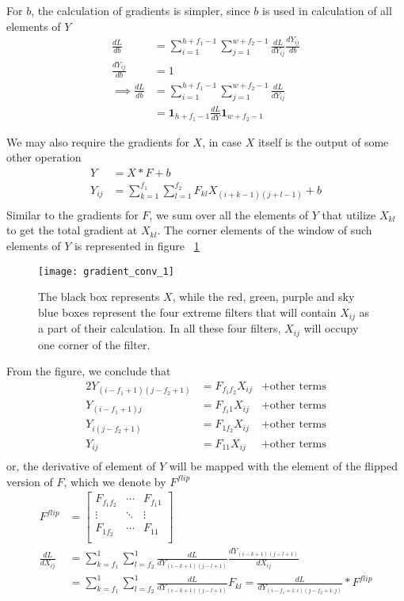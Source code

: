 \documentclass[../../deep_learning_notes.tex]{subfiles}
\begin{document}
For $b$, the calculation of gradients is simpler, since $b$ is used in calculation of all elements of $Y$
\begin{align*}
    \frac{dL}{db} &= \sum_{i=1}^{h+f_{1}-1} \sum_{j=1}^{w+f_{2}-1} \frac{dL}{dY_{ij}} \frac{dY_{ij}}{db}\\
    \frac{dY_{ij}}{db} &= 1\\
    \implies \frac{dL}{db} &= \sum_{i=1}^{h+f_{1}-1} \sum_{j=1}^{w+f_{2}-1} \frac{dL}{dY_{ij}}\\
    &= \bm{1}_{h+f_{1}-1}\frac{dL}{dY}\bm{1}_{w+f_{2}-1}
\end{align*}

We may also require the gradients for $X$, in case $X$ itself is the output of some other operation
\begin{align*}
    Y &= X * F + b\\
    Y_{ij} &= \sum_{k=1}^{f_{1}} \sum_{l=1}^{f_{2}} F_{kl} X_{(i+k-1)(j+l-1)} + b\\
\end{align*}
Similar to the gradients for $F$, we sum over all the elements of $Y$ that utilize $X_{kl}$ to get the total gradient at $X_{kl}$. The corner elements of the window of such elements of $Y$ is represented in figure ~\ref{fig:gradient_conv_1}
\begin{figure}[h]
    \texttt{[image: gradient\_conv\_1]}
    \centering
    \caption {The black box represents $X$, while the red, green, purple and sky blue boxes represent the four extreme filters that will contain $X_{ij}$ as a part of their calculation. In all these four filters, $X_{ij}$ will occupy one corner of the filter.}
    \label{fig:gradient_conv_1} %
\end{figure}
From the figure, we conclude that
\begin{alignat*}{2}
    Y_{(i-f_{1}+1)(j-f_{2}+1)} &= F_{f_{1}f_{2}}X_{ij} &+ \text{other terms}\\
    Y_{(i-f_{1}+1)j} &= F_{f_{1}1}X_{ij} &+ \text{other terms}\\
    Y_{i(j-f_{2}+1)} &= F_{1f_{2}}X_{ij} &+ \text{other terms}\\
    Y_{ij} &= F_{11}X_{ij} &+ \text{other terms}\\
\end{alignat*}
or, the derivative of element of $Y$ will be mapped with the element of the flipped version of $F$, which we denote by $F^{flip}$
\begin{align*}
    F^{flip} &= \begin{bmatrix}
        F_{f_{1}f_{2}} &\cdots &F_{f_{1}1}\\
        \vdots &\ddots &\vdots\\
        F_{1f_{2}} &\cdots &F_{11}\\
    \end{bmatrix}\\
    \frac{dL}{dX_{ij}} &= \sum_{k=f_{1}}^{1} \sum_{l=f_{2}}^{1} \frac{dL}{dY_{(i-k+1)(j-l+1)}} \frac{dY_{(i-k+1)(j-l+1)}}{dX_{ij}}\\
    &= \sum_{k=f_{1}}^{1} \sum_{l=f_{2}}^{1} \frac{dL}{dY_{(i-k+1)(j-l+1)}} F_{kl}
    = \frac{dL}{dY_{(i-f_{1}+1:i)(j-f_{2}+1:j)}} * F^{flip}
\end{align*}
\end{document}
